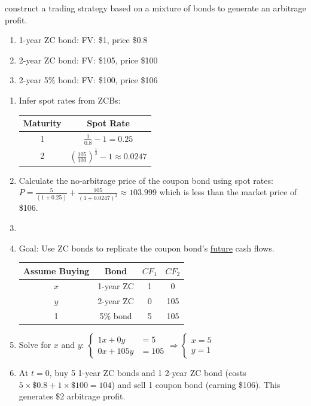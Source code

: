  construct a trading strategy based on a mixture of bonds to generate an arbitrage profit.
\begin{enumerate}[label=\Alph*.]
    \item 1-year ZC bond: FV: \$1, price \$0.8
    \item 2-year ZC bond: FV: \$105, price \$100
    \item 2-year 5\% bond: FV: \$100, price \$106
\end{enumerate}
\begin{enumerate}
    \item Infer spot rates from ZCBs:
        \begin{tabular}{cc}
            \hline
            Maturity & Spot Rate \\
            \hline
            1 & $\frac{1}{0.8} - 1 = 0.25$ \\
            2 & $\left(\frac{105}{100}\right)^{\frac{1}{2}} - 1 \approx 0.0247$ \\
            \hline
        \end{tabular}
    \item Calculate the no-arbitrage price of the coupon bond using spot rates:
        $P = \frac{5}{(1+0.25)} + \frac{105}{(1+0.0247)^2} \approx 103.999$
        which is less than the market price of \$106.
    \item {}
    \item Goal: Use ZC bonds to replicate the coupon bond's \underline{future} cash flows.
        \begin{tabular}{c|ccc}
            \hline
            Assume Buying & Bond & $CF_1$ & $CF_2$ \\
            \hline
            $x$ & 1-year ZC & 1 & 0 \\
            $y$ & 2-year ZC & 0 & 105 \\
            \hline
            1 & 5\% bond & 5 & 105 \\
            \hline
        \end{tabular}
    \item Solve for $x$ and $y$:
        $\begin{cases}
            1 x + 0 y &= 5 \\
            0 x + 105 y &= 105
        \end{cases} \Rightarrow \begin{cases}
            x = 5 \\
            y = 1
        \end{cases}$
    \item At $t = 0$, buy 5 1-year ZC bonds and 1 2-year ZC bond (costs $5 \times \mathdollar 0.8 + 1 \times \mathdollar 100 = 104$)
        and sell 1 coupon bond (earning \$106). This generates \$2 arbitrage profit.
\end{enumerate}

